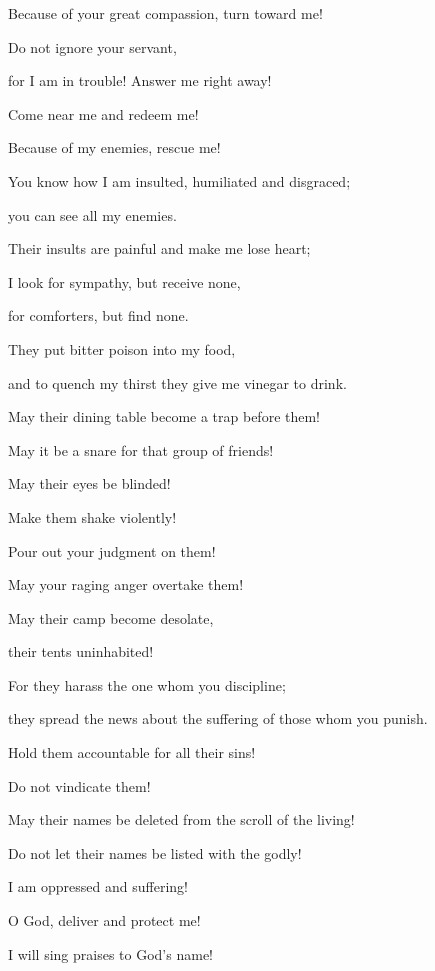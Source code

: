 {\par }{\Q Because of your great
compassion,
turn
toward me!
\par }{\Q {}Do not
ignore
your servant,
\par }{\Q for
I am in trouble! Answer
me right away!
\par }{\Q {}Come near
me
and redeem
me!

\par }{\Q Because
of my enemies,
rescue me!
\par }{\Q {}You
know
how I am insulted,
humiliated
and disgraced;
\par }{\Q you can see all
my enemies.
\par }{\Q {}Their insults
are painful
and make me lose heart;
\par }{\Q I look for
sympathy,
but
receive none,
\par }{\Q for comforters,
but find
none.
\par }{\Q {}They put
bitter poison
into my food,
\par }{\Q and to quench my thirst
they give me vinegar
to drink.
\par }{\Q {}May
their dining
table
become a trap
before
them!
\par }{\Q May it be a snare for that group of friends!
\par }{\Q {}May their eyes
be blinded!

\par }{\Q Make them shake violently!
\par }{\Q {}Pour
out your judgment
on
them!
\par }{\Q May your raging
anger
overtake them!
\par }{\Q {}May
their camp
become
desolate,
\par }{\Q their tents uninhabited!
\par }{\Q {}For
they harass
the one whom
you
discipline;
\par }{\Q they spread
the news
about
the suffering
of those whom you punish.
\par }{\Q {}Hold
them accountable
for
all their sins!

\par }{\Q Do not
vindicate them!
\par }{\Q {}May their names be deleted
from the scroll
of the living!

\par }{\Q Do not
let their names be listed
with
the godly!
\par }{\Q {}I am
oppressed
and suffering!
\par }{\Q O God,
deliver
and protect me!
\par }{\Q {}I
will sing
praises
to God’s
name!

}
